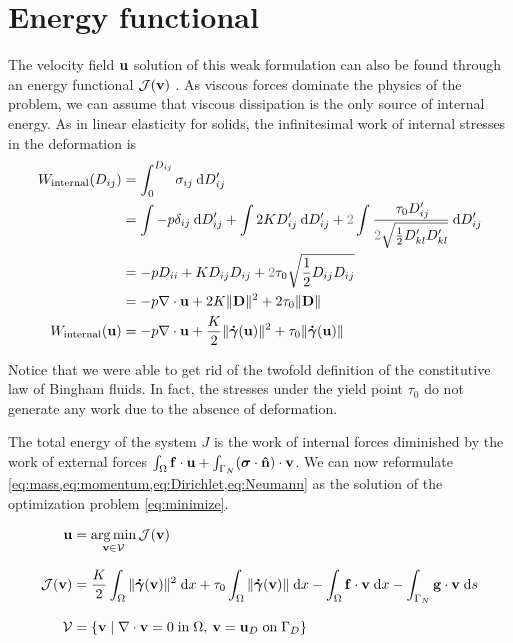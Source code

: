 \documentclass[11 pt]{report}
\begin{document}
\section{Energy functional}

The velocity field $\mathbf{u}$ solution of this weak formulation can also be found through an energy functional $\mathcal{J}(\mathbf{v})$ \cite{Saramito, Bleyer}. As viscous forces dominate the physics of the problem, we can assume that viscous dissipation is the only source of internal energy. As in linear elasticity for solids, the infinitesimal work of internal stresses in the deformation is
\begin{equation}
    \begin{aligned}
        W_{\textrm{internal}}(D_{ij}) &= \int_{0}^{D_{ij}} \sigma_{ij} \:\dd D_{ij}'\\
        &= \int -p\delta_{ij} \:\dd D_{ij}' + \int 2K D_{ij}' \:\dd D_{ij}' + {\color{gray} 2} \int \frac{ \: \tau_0 D_{ij}'}{{\color{gray} 2} \sqrt{\frac{1}{2} D_{kl}'D_{kl}'}} \:\dd D_{ij}'\\
        &= -p D_{ii} + K D_{ij} D_{ij} + {\color{gray} 2} \tau_0 \sqrt{\frac{1}{2} D_{ij} D_{ij}}\\
        &= -p \nabla \cdot \uu + 2K \|\mathbf{D}\|^2 + 2\tau_0 \|\mathbf{D}\|\\
        W_{\textrm{internal}}(\uu) &= -p \nabla \cdot \uu + \frac{K}{2} \|\gam(\uu)\|^2 + \tau_0 \|\gam(\uu)\|
    \end{aligned}
    \label{eq:energy_density}
\end{equation}

Notice that we were able to get rid of the twofold definition of the constitutive law of Bingham fluids. In fact, the stresses under the yield point $\tau_0$ do not generate any work due to the absence of deformation.

The total energy of the system $J$ is the work of internal forces diminished by the work of external forces $\int_{\Omega} \mathbf{f} \cdot \mathbf{u} + \int_{\Gamma_N} (\boldsymbol \sigma \cdot \mathbf{\hat n}) \cdot \mathbf{v}$. We can now reformulate \cref{eq:mass,eq:momentum,eq:Dirichlet,eq:Neumann} as the solution of the optimization problem \eqref{eq:minimize}.
\begin{empheqboxed}
\begin{equation}
    \begin{aligned}
        \mathbf{u} &= \operatorname*{arg\,min}_{\mathbf{v} \in \mathcal{V}} \mathcal{J}(\mathbf{v})\\[8pt]
        \mathcal{J}(\mathbf{v}) &= \frac{K}{2}\int_{\Omega} \|\boldsymbol{\dot \gamma}(\mathbf{v})\|^2 \;\dd x + \tau_0 \int_{\Omega} \|\boldsymbol{\dot \gamma}(\mathbf{v})\| \;\dd x - \int_{\Omega} \mathbf{f}\cdot \mathbf{v} \; \dd x - \int_{\Gamma_N} \mathbf{g} \cdot \mathbf{v} \;\dd s\\[8pt]
        \mathcal{V} &= \{\mathbf{v} \;\vert\; \nabla \cdot \mathbf{v} = 0 \; \text{in} \; \Omega, \: \mathbf{v} = \mathbf{u}_{D} \;\text{on}\; \Gamma_D \}
    \end{aligned}\label{eq:minimize}
\end{equation}
\end{empheqboxed}
\end{document}
